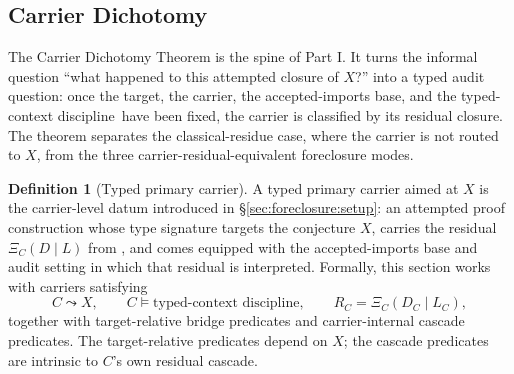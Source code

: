 \documentclass[11pt]{article}
\newcommand{\TCD}{typed-context discipline}
\theoremstyle{definition}
\newtheorem{definition}[theorem]{Definition}
\begin{document}
\subsection{Carrier Dichotomy}\label{sec:foreclosure:carrier-dichotomy}

The Carrier Dichotomy Theorem is the spine of Part I.  It turns the
informal question ``what happened to this attempted closure of \(X\)?''
into a typed audit question: once the target, the carrier, the
accepted-imports base, and the \TCD\ have been fixed, the carrier is
classified by its residual closure.  The theorem separates the
classical-residue case, where the carrier is not routed to \(X\), from
the three carrier-residual-equivalent foreclosure modes.

\begin{definition}[Typed primary carrier]\label{def:typed-primary-carrier}
A typed primary carrier aimed at \(X\) is the carrier-level datum
introduced in \S\ref{sec:foreclosure:setup}: an attempted proof
construction whose type signature targets the conjecture \(X\), carries
the residual \(\Xi_C(D\mid L)\) from , and
comes equipped with the accepted-imports base and audit setting in
which that residual is interpreted.
Formally, this section works with carriers satisfying
\[
  C\leadsto X,\qquad C\models\text{\TCD},\qquad
  R_C=\Xi_C(D_C\mid L_C),
\]
together with target-relative bridge predicates and carrier-internal
cascade predicates.  The target-relative predicates depend on \(X\);
the cascade predicates are intrinsic to \(C\)'s own residual cascade.
\end{definition}
\end{document}
